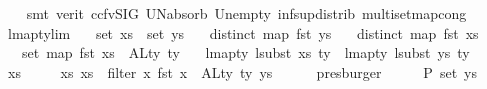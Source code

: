 \begin{isabellebody}
\ \ \isamarkupfalse%
\ {\isacharparenleft}{\kern0pt}smt\ {\isacharparenleft}{\kern0pt}verit{\isacharcomma}{\kern0pt}\ ccfv{\isacharunderscore}{\kern0pt}SIG{\isacharparenright}{\kern0pt}\ UN{\isacharunderscore}{\kern0pt}absorb\ Un{\isacharunderscore}{\kern0pt}empty\ inf{\isacharunderscore}{\kern0pt}sup{\isacharunderscore}{\kern0pt}distrib{}\ multiset{\isachardot}{\kern0pt}map{\isacharunderscore}{\kern0pt}cong{\isacharparenright}{\kern0pt}\isanewline
{}\isamarkupfalse%
%
\endisatagproof
{\isafoldproof}%
%
\isadelimproof
\isanewline
%
\endisadelimproof
\isanewline
\isanewline
{}\isamarkupfalse%
\ lmap{\isacharunderscore}{\kern0pt}ty{\isacharunderscore}{\kern0pt}lim{}{\isacharcolon}{\kern0pt}\isanewline
\ \ \ {\isachardoublequoteopen}set\ xs\ {\isasymsubseteq}\ set\ ys{\isachardoublequoteclose}\isanewline
\ \ \ {\isachardoublequoteopen}distinct\ {\isacharparenleft}{\kern0pt}map\ fst\ ys{\isacharparenright}{\kern0pt}{\isachardoublequoteclose}\isanewline
\ \ \ {\isachardoublequoteopen}distinct\ {\isacharparenleft}{\kern0pt}map\ fst\ xs{\isacharparenright}{\kern0pt}{\isachardoublequoteclose}\isanewline
\ \ \ {\isachardoublequoteopen}set\ {\isacharparenleft}{\kern0pt}map\ fst\ xs{\isacharparenright}{\kern0pt}\ {\isacharequal}{\kern0pt}\ ALty\ ty{\isachardoublequoteclose}\isanewline
\ \ \ {\isachardoublequoteopen}lmap{\isacharunderscore}{\kern0pt}ty\ {\isacharparenleft}{\kern0pt}lsubst\ xs{\isacharparenright}{\kern0pt}\ ty\ {\isacharequal}{\kern0pt}\ lmap{\isacharunderscore}{\kern0pt}ty\ {\isacharparenleft}{\kern0pt}lsubst\ ys{\isacharparenright}{\kern0pt}\ ty{\isachardoublequoteclose}\isanewline
%
\isadelimproof
%
\endisadelimproof
%
\isatagproof
{}\isamarkupfalse%
\ {\isacharminus}{\kern0pt}\isanewline
\ \ \isamarkupfalse%
\ xs{}\ \isanewline
\ \ \ \ xs{}{\isacharcolon}{\kern0pt}\ {\isachardoublequoteopen}xs{}\ {\isacharequal}{\kern0pt}\ filter\ {\isacharparenleft}{\kern0pt}{\isasymlambda}x{\isachardot}{\kern0pt}\ fst\ x\ {\isasymnotin}\ ALty\ ty{\isacharparenright}{\kern0pt}\ ys{\isachardoublequoteclose}\isanewline
\ \ \ \ \isamarkupfalse%
\ presburger\isanewline
\ \ \isamarkupfalse%
\ \isamarkupfalse%
\ P{}{\isacharcolon}{\kern0pt}\ {\isachardoublequoteopen}set\ ys\ {\isacharequal}{\kern0pt}\ \isanewline

\end{isabellebody}

